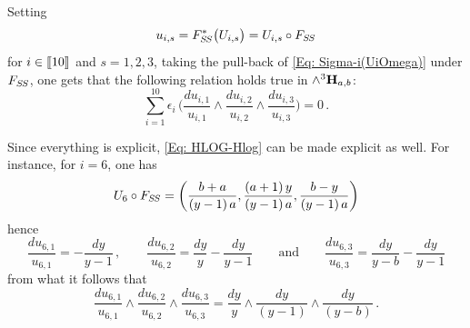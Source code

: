 \documentclass[11pt]{amsart}
\begin{document}
 
 
 
 
Setting 
$$u_{i,s}=F_{S\hspace{-0.03cm}S}^*\big( U_{i,s}
 \big)=U_{i,s}\circ F_{S\hspace{-0.03cm}S}$$
  for $i\in [\hspace{-0.05cm}[ 10  ]\hspace{-0.05cm}]$ and $s=1,2,3$, taking the pull-back of 
 \eqref{Eq: Sigma-i(UiOmega)} under $F_{S\hspace{-0.03cm}S}$, one gets that the following relation holds true  in $\wedge^3 {\bf H}_{a,b}$: 
\begin{equation}%
\label{Eq: HLOG-Hlog}%
 \sum_{i=1}^{10} \epsilon_i \,  \bigg( 
\frac{d u_{i,1}}{ u_{i,1} }
\wedge 
\frac{d u_{i,2}}{ u_{i,2} }
\wedge 
\frac{d u_{i,3}}{ u_{i,3} }
  \bigg)=0\, . 
 \end{equation}%



Since everything is explicit,  \eqref{Eq: HLOG-Hlog} can be made explicit as well. 
For instance, for $i=6$, one has 
$$
U_6\circ F_{S\hspace{-0.03cm}S}=
\left(\frac{b +a}{\left(y-1 \right) a}, 
\frac{\left(a +1\right) y}{\left(y-1 \right) a}, 
\frac{b -y}{\left(y-1 \right) a}\right)
$$
hence 
\begin{equation}
\label{Eq:du-i-s}
\frac{d u_{6,1}}{ u_{6,1} }= {-\frac{dy}{y-1}}\, , \qquad  \frac{d u_{6,2}}{ u_{6,2} }=
\frac{dy}{y}-\frac{dy}{y-1}\qquad  \mbox{and}
\qquad  
\frac{d u_{6,3}}{ u_{6,3} }=
{\frac{dy}{y-b}-\frac{dy}{y-1}}
\end{equation}
from what it follows that 
$$
\frac{d u_{6,1}}{ u_{6,1} }
\wedge 
\frac{d u_{6,2}}{ u_{6,2} }
\wedge 
\frac{d u_{6,3}}{ u_{6,3} }
=
 \frac{dy}{y} \wedge 
\frac{dy}{(y-1)}
\wedge  \frac{dy}{(y-b)}
\, . 
$$
\end{document}
